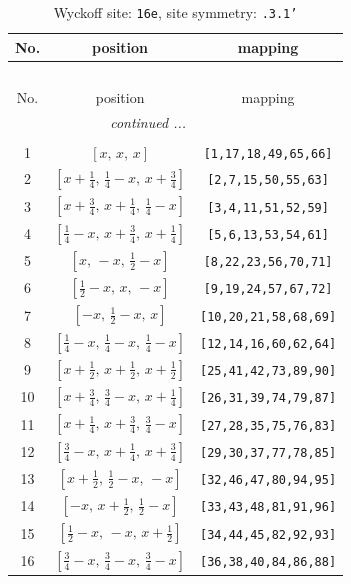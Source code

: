 \documentclass[fleqn,8pt]{jsarticle}
\begin{document}
\begin{longtable}{ccc}
\caption{Wyckoff site: {\tt 16e}, site symmetry: {\tt .3.1'}}
 \\
 \hline \hline
No. & position & mapping \\ \hline \endfirsthead

\multicolumn{2}{l}{\tablename\ \thetable{}} \\
 \hline \hline
No. & position & mapping \\ \hline \endhead

 \hline \hline
\multicolumn{2}{r}{\footnotesize\it continued ...} \\ \endfoot

 \hline \hline
\multicolumn{2}{r}{} \\ \endlastfoot

1 & $\left[ x,\, x,\, x \right]$ & {\tt [1,17,18,49,65,66]} \\ \hline
2 & $\left[ x + \frac{1}{4},\, \frac{1}{4} - x,\, x + \frac{3}{4} \right]$ & {\tt [2,7,15,50,55,63]} \\ \hline
3 & $\left[ x + \frac{3}{4},\, x + \frac{1}{4},\, \frac{1}{4} - x \right]$ & {\tt [3,4,11,51,52,59]} \\ \hline
4 & $\left[ \frac{1}{4} - x,\, x + \frac{3}{4},\, x + \frac{1}{4} \right]$ & {\tt [5,6,13,53,54,61]} \\ \hline
5 & $\left[ x,\, - x,\, \frac{1}{2} - x \right]$ & {\tt [8,22,23,56,70,71]} \\ \hline
6 & $\left[ \frac{1}{2} - x,\, x,\, - x \right]$ & {\tt [9,19,24,57,67,72]} \\ \hline
7 & $\left[ - x,\, \frac{1}{2} - x,\, x \right]$ & {\tt [10,20,21,58,68,69]} \\ \hline
8 & $\left[ \frac{1}{4} - x,\, \frac{1}{4} - x,\, \frac{1}{4} - x \right]$ & {\tt [12,14,16,60,62,64]} \\ \hline
9 & $\left[ x + \frac{1}{2},\, x + \frac{1}{2},\, x + \frac{1}{2} \right]$ & {\tt [25,41,42,73,89,90]} \\ \hline
10 & $\left[ x + \frac{3}{4},\, \frac{3}{4} - x,\, x + \frac{1}{4} \right]$ & {\tt [26,31,39,74,79,87]} \\ \hline
11 & $\left[ x + \frac{1}{4},\, x + \frac{3}{4},\, \frac{3}{4} - x \right]$ & {\tt [27,28,35,75,76,83]} \\ \hline
12 & $\left[ \frac{3}{4} - x,\, x + \frac{1}{4},\, x + \frac{3}{4} \right]$ & {\tt [29,30,37,77,78,85]} \\ \hline
13 & $\left[ x + \frac{1}{2},\, \frac{1}{2} - x,\, - x \right]$ & {\tt [32,46,47,80,94,95]} \\ \hline
14 & $\left[ - x,\, x + \frac{1}{2},\, \frac{1}{2} - x \right]$ & {\tt [33,43,48,81,91,96]} \\ \hline
15 & $\left[ \frac{1}{2} - x,\, - x,\, x + \frac{1}{2} \right]$ & {\tt [34,44,45,82,92,93]} \\ \hline
16 & $\left[ \frac{3}{4} - x,\, \frac{3}{4} - x,\, \frac{3}{4} - x \right]$ & {\tt [36,38,40,84,86,88]} \\
\end{longtable}
\end{document}
